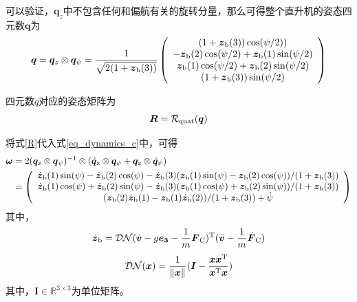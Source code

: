 可以验证，$\boldsymbol{q}_z$中不包含任何和偏航有关的旋转分量，那么可得整个直升机的姿态四元数$\boldsymbol{q}$为
\begin{equation}
    \boldsymbol{q} = \boldsymbol{q}_z \otimes \boldsymbol{q}_\psi = \frac{1}{\sqrt{2(1+{\boldsymbol{z}\rm{_b}}(3))}} \left( \begin{array}{c}
        (1+\boldsymbol{z}{\rm{_b}}(3))\cos(\psi/2))\\
        -\boldsymbol{z}{\rm{_b}}(2)\cos(\psi/2) + \boldsymbol{z}{\rm{_b}}(1)\sin(\psi/2)\\
        \boldsymbol{z}{\rm{_b}}(1)\cos(\psi/2) + \boldsymbol{z}{\rm{_b}}(2)\sin(\psi/2)\\
        (1+\boldsymbol{z}{\rm{_b}}(3))\sin(\psi/2)\\
        \end{array} \right)
\end{equation}

四元数$q$对应的姿态矩阵为
\begin{equation}\label{R}
    \boldsymbol{R} = \mathcal{R}{\rm{_{quat}}}(\boldsymbol{q})
\end{equation}

将式\ref{R}代入式\ref{eq_dynamics_c}中，可得
\begin{equation}\label{omega}
    \begin{aligned}
        \boldsymbol{\omega} &= 2(\boldsymbol{q}{\rm{_z}} \otimes \boldsymbol{q}{\rm{_\psi}})^{-1} \otimes (
            \dot{\boldsymbol{q}}{\rm{_z}} \otimes \boldsymbol{q}_\psi + \boldsymbol{q}{\rm{_z}}\otimes{\dot{\boldsymbol{q}}_\psi})\\
            &= \left(\begin{array}{c}
                \dot{\boldsymbol{z}}{\rm{_b}}(1)\sin(\psi) - \dot{\boldsymbol{z}}{\rm{_b}}(2)\cos(\psi) - \dot{\boldsymbol{z}}{\rm{_b}}(3)(\boldsymbol{z}{\rm{_b}}(1)\sin(\psi) - \boldsymbol{z}{\rm{_b}}(2)\cos(\psi))/(1+\boldsymbol{z}{\rm{_b}}(3))\\
                \dot{\boldsymbol{z}}{\rm{_b}}(1)\cos(\psi) + \dot{\boldsymbol{z}}{\rm{_b}}(2)\sin(\psi) - \dot{\boldsymbol{z}}{\rm{_b}}(3)(\boldsymbol{z}{\rm{_b}}(1)\cos(\psi) + \boldsymbol{z}{\rm{_b}}(2)\sin(\psi))/(1+\boldsymbol{z}{\rm{_b}}(3))\\
                (\boldsymbol{z}{\rm{_b}}(2)\dot{\boldsymbol{z}}{\rm{_b}}(1) - \boldsymbol{z}{\rm{_b}}(1)\dot{\boldsymbol{z}}{\rm{_b}}(2))/(1+\boldsymbol{z}{\rm{_b}}(3)) + \dot{\psi}
            \end{array}\right)
    \end{aligned}
\end{equation}
其中，
\begin{equation}
    \dot{\boldsymbol{z}}{\rm{_b}} = \mathcal{DN}(\dot{\boldsymbol{v}} -g{\boldsymbol{e_3}} - \frac{1}{m}{\boldsymbol{F}\rm{_C}}){\rm{^T}}(\ddot{\boldsymbol{v}} - \frac{1}{m} \dot{\boldsymbol{F}}{\rm{_C}} )
\end{equation}
\begin{equation}
    \mathcal{DN}(\boldsymbol{x}) = \frac{1}{\left\| {\boldsymbol{x}} \right\|}(\boldsymbol{I} - \frac{\boldsymbol{xx}{\rm{^T}}}{\boldsymbol{x}{\rm{^T}}\boldsymbol{x}})
\end{equation}
其中，$\boldsymbol{I}\in \mathbb{R}^{3\times3}$为单位矩阵。

